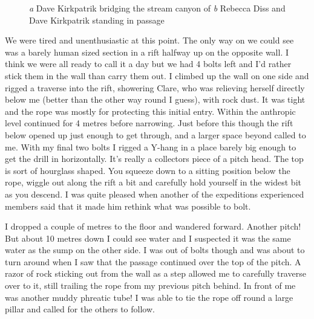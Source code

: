   \begin{figure}[t!]
\checkoddpage \ifoddpage \forcerectofloat \else \forceversofloat \fi
\centering
\begin{subfigure}[t]{0.495\textwidth}
\centering
{}
 \caption{}\label{water hallelujah}
\end{subfigure}
    \hfill
    \begin{subfigure}[t]{0.495\textwidth}
        \centering
        \caption{} \label{Diss and Dave}
    \end{subfigure}
    \caption{
    \emph{a} Dave Kirkpatrik bridging the stream canyon of 
    \emph{b} Rebecca Diss and Dave Kirkpatrik standing in  passage }
\end{figure}
 
We were tired and unenthusiastic at this point. The only way on we could see was a barely human sized section in a rift halfway up on the opposite wall. I think we were all ready to call it a day but we had 4 bolts left and I'd rather stick them in the wall than carry them out. I climbed up the wall on one side and rigged a traverse into the rift, showering Clare, who was relieving herself directly below me (better than the other way round I guess), with rock dust. It was tight and the rope was mostly for protecting this initial entry. Within the anthropic level continued for 4 metres before narrowing. Just before this though the rift below opened up just enough to get through, and a larger space beyond called to me. With my final two bolts I rigged a Y-hang in a place barely big enough to get the drill in horizontally. It's really a collectors piece of a pitch head. The top is sort of hourglass shaped. You squeeze down to a sitting position below the rope, wiggle out along the rift a bit and carefully hold yourself in the widest bit as you descend. I was quite pleased when another of the expeditions experienced members said that it made him rethink what was possible to bolt.

I dropped a couple of metres to the floor and wandered forward. Another pitch! But about 10 metres down I could see water and I suspected it was the same water as the sump on the other side. I was out of bolts though and was about to turn around when I saw that the passage continued over the top of the pitch. A razor of rock sticking out from the wall as a step allowed me to carefully traverse over to it, still trailing the rope from my previous pitch behind. In front of me was another muddy phreatic tube! I was able to tie the rope off round a large pillar and called for the others to follow.
 

